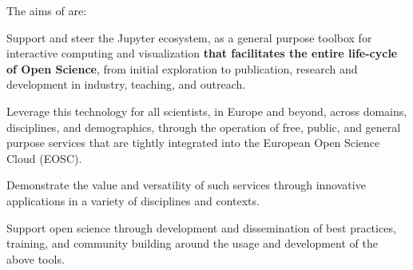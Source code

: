 
\noindent The aims of \TheProject are:

\begin{compactenum}
\item Support and steer the Jupyter ecosystem, as a general purpose
  toolbox for interactive computing and visualization \textbf{that
    facilitates the entire life-cycle of Open Science}, from initial
  exploration to publication, research and development in industry,
  teaching, and outreach.

\item Leverage this technology for all scientists, in Europe and
  beyond, across domains, disciplines, and demographics, through the
  operation of free, public, and general purpose services that are
  tightly integrated into the European Open Science Cloud (EOSC).

\item Demonstrate the value and versatility of such services through
  innovative applications in a variety of disciplines and contexts.

\item Support open science through development and dissemination of
  best practices, training, and community building around the usage
  and development of the above tools.
\end{compactenum}

  



